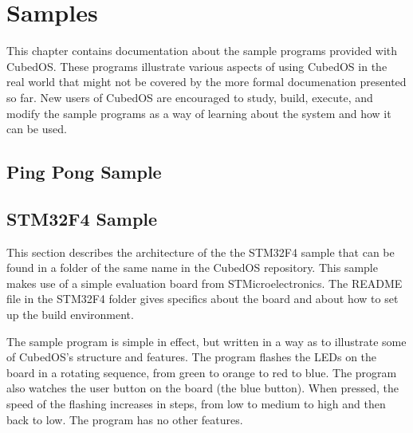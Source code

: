 
\chapter{Samples}
\label{chapt:samples}

This chapter contains documentation about the sample programs provided with Cubed\-OS. These
programs illustrate various aspects of using CubedOS in the real world that might not be
covered by the more formal documenation presented so far. New users of CubedOS are encouraged to
study, build, execute, and modify the sample programs as a way of learning about the system and
how it can be used.

\section{Ping Pong Sample}
\label{sec:ping-pong-sample}


\section{STM32F4 Sample}
\label{sec:stm32f4-sample}

This section describes the architecture of the the STM32F4 sample that can be found in a folder
of the same name in the CubedOS repository. This sample makes use of a simple evaluation board
from STMicroelectronics. The README file in the STM32F4 folder gives specifics about the board
and about how to set up the build environment.

The sample program is simple in effect, but written in a way as to illustrate some of CubedOS's
structure and features. The program flashes the LEDs on the board in a rotating sequence, from
green to orange to red to blue. The program also watches the user button on the board (the blue
button). When pressed, the speed of the flashing increases in steps, from low to medium to high
and then back to low. The program has no other features.

